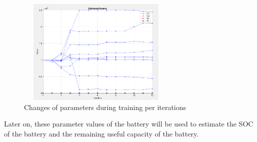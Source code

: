 \begin{figure}
\includegraphics[height=2in, width=3in]{figures/Iterations}
\caption{Changes of parameters during training per iterations}
\label{fig:iterations}
\end{figure}

Later on, these parameter values of the battery will be used to estimate the SOC of the battery and the remaining useful capacity of the battery.

